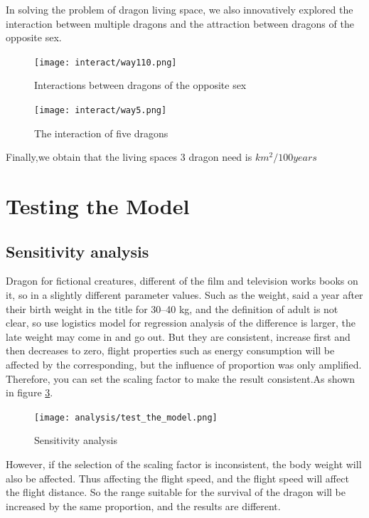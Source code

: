 In solving the problem of dragon living space, we also innovatively explored the interaction between multiple dragons and the attraction between dragons of the opposite sex.

\begin{figure}[htbp]
    \centering
    \texttt{[image: interact/way110.png]}
    \caption{Interactions between dragons of the opposite sex}
    \label{fig:110}
\end{figure}

\begin{figure}[htbp]
    \centering
    \texttt{[image: interact/way5.png]}
    \caption{The interaction of five dragons}
    \label{fig:five-dragon}
\end{figure}

Finally,we obtain that the living spaces 3 dragon need is $km^2/100years$

\section{Testing the Model}
\subsection{Sensitivity analysis}
Dragon for fictional creatures, different of the film and television works books on it, so in a slightly different parameter values. Such as the weight, said a year after their birth weight in the title for 30--40 kg, and the definition of adult is not clear, so use logistics model for regression analysis of the difference is larger, the late weight may come in and go out. But they are consistent, increase first and then decreases to zero, flight properties such as energy consumption will be affected by the corresponding, but the influence of proportion was only amplified. Therefore, you can set the scaling factor to make the result consistent.As shown in figure \ref{fig:test_model}.

\begin{figure}[htbp]
    \centering
    \texttt{[image: analysis/test\_the\_model.png]}
    \caption{Sensitivity analysis}
    \label{fig:test_model}
\end{figure}

However, if the selection of the scaling factor is inconsistent, the body weight will also be affected. Thus affecting the flight speed, and the flight speed will affect the flight distance. So the range suitable for the survival of the dragon will be increased by the same proportion, and the results are different.


